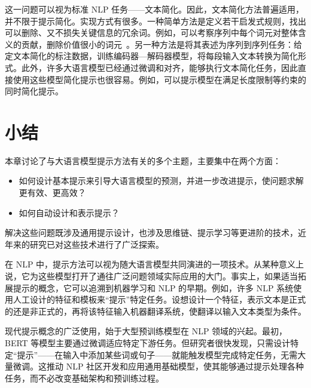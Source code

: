 这一问题可以视为标准 NLP 任务——文本简化。因此，文本简化方法普遍适用，并不限于提示简化。实现方式有很多。一种简单方法是定义若干启发式规则，找出可以删除、又不损失关键信息的冗余词。例如，可以考察序列中每个词元对整体含义的贡献，删除价值很小的词元~\cite{li-etal:2023compressing,jiang-etal:2023llmlingua}。另一种方法是将其表述为序列到序列任务：给定文本简化的标注数据，训练编码器—解码器模型，将每段输入文本转换为简化形式。此外，许多大语言模型已经通过微调和对齐，能够执行文本简化任务，因此直接使用这些模型简化提示也很容易。例如，可以提示模型在满足长度限制等约束的同时简化提示。


\section{小结}

\noindent 本章讨论了与大语言模型提示方法有关的多个主题，主要集中在两个方面：

\begin{itemize}
\item \vspace{0.5em} 如何设计基本提示来引导大语言模型的预测，并进一步改进提示，使问题求解更有效、更高效？
\item \vspace{0.3em} 如何自动设计和表示提示？
\end{itemize}
\vspace{0.3cm}

\noindent 解决这些问题既涉及通用提示设计，也涉及思维链、提示学习等更进阶的技术，近年来的研究已对这些技术进行了广泛探索。

在 NLP 中，提示方法可以视为随大语言模型共同演进的一项技术。从某种意义上说，它为这些模型打开了通往广泛问题领域实际应用的大门。事实上，如果适当拓展提示的概念，它可以追溯到机器学习和 NLP 的早期。例如，许多 NLP 系统使用人工设计的特征和模板来“提示”特定任务。设想设计一个特征，表示文本是正式的还是非正式的，再将该特征输入机器翻译系统，使翻译以输入文本类型为条件。

现代提示概念的广泛使用，始于大型预训练模型在 NLP 领域的兴起。最初，BERT 等模型主要通过微调适应特定下游任务。但研究者很快发现，只需设计特定“提示”——在输入中添加某些词或句子——就能触发模型完成特定任务，无需大量微调。这推动 NLP 社区开发和应用通用基础模型，使其能够通过提示处理各种任务，而不必改变基础架构和预训练过程。

